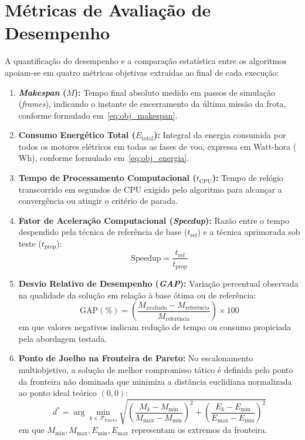 \section{Métricas de Avaliação de Desempenho}\label{sec:metricas_avaliacao}

A quantificação do desempenho e a comparação estatística entre os algoritmos apoiam-se em quatro métricas objetivas extraídas ao final de cada execução:

\begin{enumerate}
    \item \textbf{\textit{Makespan} ($M$):} Tempo final absoluto medido em passos de simulação (\textit{frames}), indicando o instante de encerramento da última missão da frota, conforme formulado em~\eqref{eq:obj_makespan}.
    \item \textbf{Consumo Energético Total ($E_{\text{total}}$):} Integral da energia consumida por todos os motores elétricos em todas as fases de voo, expressa em Watt-hora ($\text{Wh}$), conforme formulado em~\eqref{eq:obj_energia}.
    \item \textbf{Tempo de Processamento Computacional ($t_{\text{CPU}}$):} Tempo de relógio transcorrido em segundos de CPU exigido pelo algoritmo para alcançar a convergência ou atingir o critério de parada.
    \item \textbf{Fator de Aceleração Computacional (\textit{Speedup}):} Razão entre o tempo despendido pela técnica de referência de base ($t_{\text{ref}}$) e a técnica aprimorada sob teste ($t_{\text{prop}}$):
    \begin{equation}\label{eq:metrica_speedup}
    \text{Speedup} = \frac{t_{\text{ref}}}{t_{\text{prop}}}
    \end{equation}
    \item \textbf{Desvio Relativo de Desempenho (\textit{GAP}):} Variação percentual observada na qualidade da solução em relação à base ótima ou de referência:
    \begin{equation}\label{eq:metrica_gap}
    \text{GAP} (\%) = \left( \frac{M_{\text{avaliado}} - M_{\text{referência}}}{M_{\text{referência}}} \right) \times 100
    \end{equation}
    em que valores negativos indicam redução de tempo ou consumo propiciada pela abordagem testada.
    \item \textbf{Ponto de Joelho na Fronteira de Pareto:} No escalonamento multiobjetivo, a solução de melhor compromisso tático é definida pelo ponto da fronteira não dominada que minimiza a distância euclidiana normalizada ao ponto ideal teórico $(0, 0)$:
    \begin{equation}\label{eq:metrica_joelho}
    d^* = \arg\min_{k \in \mathcal{F}_{\text{Pareto}}} \sqrt{\left(\frac{M_k - M_{\text{min}}}{M_{\text{max}} - M_{\text{min}}}\right)^2 + \left(\frac{E_k - E_{\text{min}}}{E_{\text{max}} - E_{\text{min}}}\right)^2}
    \end{equation}
    em que $M_{\text{min}}, M_{\text{max}}, E_{\text{min}}, E_{\text{max}}$ representam os extremos da fronteira.
\end{enumerate}

